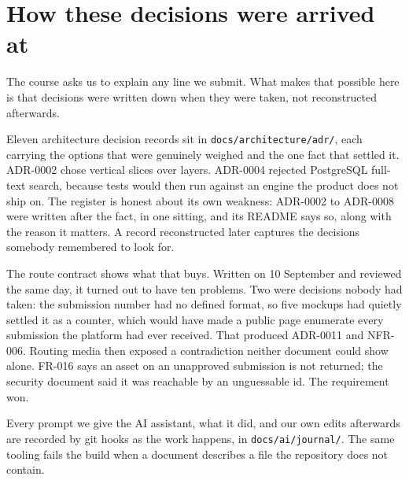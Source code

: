 \documentclass[11pt]{article}
\begin{document}
\section{How these decisions were arrived at}

The course asks us to explain any line we submit. What makes that possible here is that decisions
were written down when they were taken, not reconstructed afterwards.

Eleven architecture decision records sit in \texttt{docs/architecture/adr/}, each carrying the
options that were genuinely weighed and the one fact that settled it. ADR-0002 chose vertical slices
over layers. ADR-0004 rejected PostgreSQL full-text search, because tests would then run against an
engine the product does not ship on. The register is honest about its own weakness: ADR-0002 to
ADR-0008 were written after the fact, in one sitting, and its README says so, along with the reason
it matters. A record reconstructed later captures the decisions somebody remembered to look for.

The route contract shows what that buys. Written on 10 September and reviewed the same day, it turned
out to have ten problems. Two were decisions nobody had taken: the submission number had no defined
format, so five mockups had quietly settled it as a counter, which would have made a public page
enumerate every submission the platform had ever received. That produced ADR-0011 and NFR-006.
Routing media then exposed a contradiction neither document could show alone. FR-016 says an asset on
an unapproved submission is not returned; the security document said it was reachable by an
unguessable id. The requirement won.

Every prompt we give the AI assistant, what it did, and our own edits afterwards are recorded by git
hooks as the work happens, in \texttt{docs/ai/journal/}. The same tooling fails the build when a
document describes a file the repository does not contain.
\end{document}
